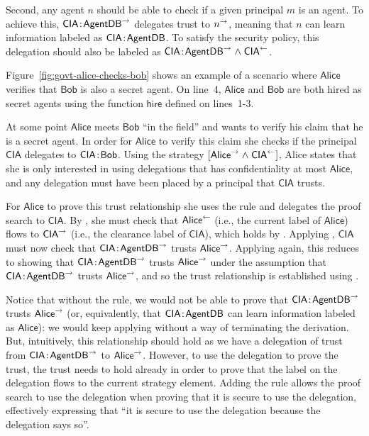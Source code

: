 Second, any agent $n$ should be able to check if a given principal $m$ is an agent. To achieve this, $\mathsf{CIA}\!:\!\mathsf{AgentDB}^{\rightarrow}$ delegates trust to $n^{\rightarrow}$, meaning that $n$ can learn information labeled as $\mathsf{CIA}\!:\!\mathsf{AgentDB}$. To satisfy the security policy, this delegation should also be labeled as $\mathsf{CIA}\!:\!\mathsf{AgentDB}^{\rightarrow} \mathrel{\land} \mathsf{CIA}^{\leftarrow}$.

Figure~\ref{fig:govt-alice-checks-bob} shows an example of a scenario where $\mathsf{Alice}$ verifies that $\mathsf{Bob}$ is also a secret agent. On line~4, $\mathsf{Alice}$ and $\mathsf{Bob}$ are both hired as secret agents using the function $\mathsf{hire}$ defined on lines~1-3. 

At some point $\mathsf{Alice}$ meets $\mathsf{Bob}$ ``in the field'' and wants to verify his claim that he is a secret agent. In order for $\mathsf{Alice}$ to verify this claim she checks if the principal $\mathsf{CIA}$ delegates to $\mathsf{CIA}\!:\!\mathsf{Bob}$. Using the strategy $[\mathsf{Alice}^{\rightarrow} \mathrel{\land} \mathsf{CIA}^{\leftarrow}]$, Alice states that she is only interested in using delegations that has confidentiality at most $\mathsf{Alice}$, and any delegation must have been placed by a principal that $\mathsf{CIA}$ trusts.

For $\mathsf{Alice}$ to prove this trust relationship she uses the  rule and delegates the proof search to $\mathsf{CIA}$. By , she must check that $\mathsf{Alice}^{\leftarrow}$ (i.e., the current label of $\mathsf{Alice}$) flows to $\mathsf{CIA}^{\rightarrow}$ (i.e., the clearance label of $\mathsf{CIA}$), which holds by . Applying , $\mathsf{CIA}$ must now check that $\mathsf{CIA}\!:\!\mathsf{AgentDB}^{\rightarrow}$ trusts $\mathsf{Alice}^{\rightarrow}$. Applying  again, this reduces to showing that $\mathsf{CIA}\!:\!\mathsf{AgentDB}^{\rightarrow}$ trusts $\mathsf{Alice}^{\rightarrow}$ under the assumption that $\mathsf{CIA}\!:\!\mathsf{AgentDB}^{\rightarrow}$ trusts $\mathsf{Alice}^{\rightarrow}$, and so the trust relationship is established using .

Notice that without the  rule, we would not be able to prove that $\mathsf{CIA}\!:\!\mathsf{AgentDB}^{\rightarrow}$ trusts $\mathsf{Alice}^{\rightarrow}$ (or, equivalently, that $\mathsf{CIA}\!:\!\mathsf{AgentDB}$ can learn information labeled as $\mathsf{Alice}$): we would keep applying  without a way of terminating the derivation. But, intuitively, this relationship should hold as we have a delegation of trust from $\mathsf{CIA}\!:\!\mathsf{AgentDB}^{\rightarrow}$ to $\mathsf{Alice}^{\rightarrow}$. However, to use the delegation to prove the trust, the trust needs to hold already in order to prove that the label on the delegation flows to the current strategy element. Adding the  rule allows the proof search to use the delegation when proving that it is secure to use the delegation, effectively expressing that ``it is secure to use the delegation because the delegation says so''.

